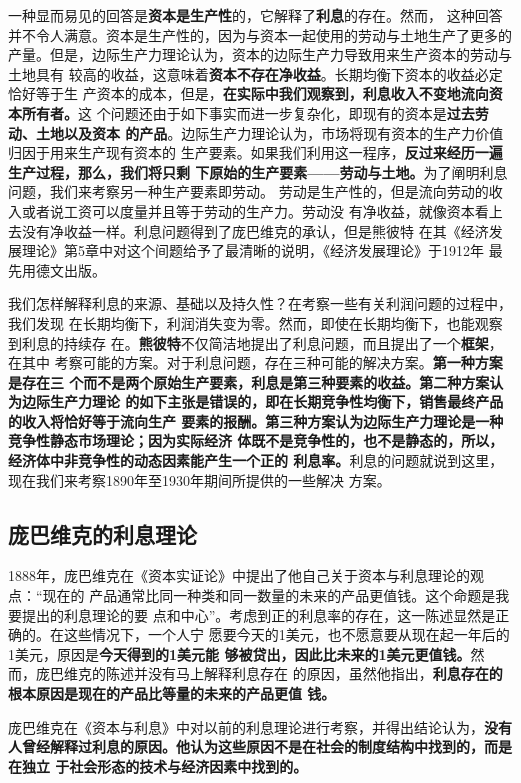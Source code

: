 一种显而易见的回答是\textbf{资本是生产性}的，它解释了\textbf{利息}的存在。然而，
这种回答并不令人满意。资本是生产性的，因为与资本一起使用的劳动与土地生产了更多的
产量。但是，边际生产力理论认为，资本的边际生产力导致用来生产资本的劳动与土地具有
较高的收益，这意味着\textbf{资本不存在净收益}。长期均衡下资本的收益必定恰好等于生
产资本的成本，但是，\textbf{在实际中我们观察到，利息收入不变地流向资本所有者。}这
个问题还由于如下事实而进一步复杂化，即现有的资本是\textbf{过去劳动、土地以及资本
  的产品}。边际生产力理论认为，市场将现有资本的生产力价值归因于用来生产现有资本的
生产要素。如果我们利用这一程序，\textbf{反过来经历一遍生产过程，那么，我们将只剩
  下原始的生产要素——劳动与土地。}为了阐明利息问题，我们来考察另一种生产要素即劳动。
劳动是生产性的，但是流向劳动的收入或者说工资可以度量并且等于劳动的生产力。劳动没
有净收益，就像资本看上去没有净收益一样。利息问题得到了庞巴维克的承认，但是熊彼特
在其《经济发展理论》第5章中对这个间题给予了最清晰的说明，《经济发展理论》于1912年
最先用德文出版。

我们怎样解释利息的来源、基础以及持久性？在考察一些有关利润问题的过程中，我们发现
在长期均衡下，利润消失变为零。然而，即使在长期均衡下，也能观察到利息的持续存
在。\textbf{熊彼特}不仅简洁地提出了利息问题，而且提出了一个\textbf{框架}，在其中
考察可能的方案。对于利息问题，存在三种可能的解决方案。\textbf{第一种方案是存在三
  个而不是两个原始生产要素，利息是第三种要素的收益。第二种方案认为边际生产力理论
  的如下主张是错误的，即在长期竞争性均衡下，销售最终产品的收入将恰好等于流向生产
  要素的报酬。第三种方案认为边际生产力理论是一种竞争性静态市场理论；因为实际经济
  体既不是竞争性的，也不是静态的，所以，经济体中非竞争性的动态因素能产生一个正的
  利息率。}利息的问题就说到这里，现在我们来考察1890年至1930年期间所提供的一些解决
方案。

\subsection{庞巴维克的利息理论}

1888年，庞巴维克在《资本实证论》中提出了他自己关于资本与利息理论的观点：“现在的
产品通常比同一种类和同一数量的未来的产品更值钱。这个命题是我要提出的利息理论的要
点和中心”。考虑到正的利息率的存在，这一陈述显然是正确的。在这些情况下，一个人宁
愿要今天的1美元，也不愿意要从现在起一年后的1美元，原因是\textbf{今天得到的1美元能
  够被贷出，因此比未来的1美元更值钱。}然而，庞巴维克的陈述并没有马上解释利息存在
的原因，虽然他指出，\textbf{利息存在的根本原因是现在的产品比等量的未来的产品更值
  钱。}

庞巴维克在《资本与利息》中对以前的利息理论进行考察，并得出结论认为，\textbf{没有
  人曾经解释过利息的原因。他认为这些原因不是在社会的制度结构中找到的，而是在独立
  于社会形态的技术与经济因素中找到的。}

